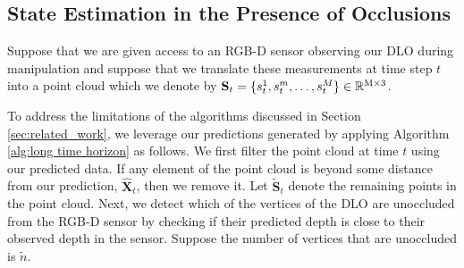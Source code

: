 \subsection{State Estimation in the Presence of Occlusions}
\label{section: filter}

Suppose that we are given access to an RGB-D sensor observing our DLO during manipulation and suppose that we translate these measurements at time step $t$ into a point cloud which we denote by  $\textbf{S}_t = \{s_t^1, s_t^m, \dots, s_t^M\} \in\mathbb{R}^{\text{M}\times3}$.

To address the limitations of the algorithms discussed in Section \ref{sec:related_work}, we leverage our predictions generated by applying Algorithm \ref{alg:long time horizon} as follows.
We first filter the point cloud at time $t$ using our predicted data.
If any element of the point cloud is beyond some distance from our prediction, $\hat{\textbf{X}}_t$, then we remove it.
Let $\tilde{\textbf{S}}_t$ denote the remaining points in the point cloud.
Next, we detect which of the vertices of the DLO are unoccluded from the RGB-D sensor by checking if their predicted depth is close to their observed depth in the sensor.
Suppose the number of vertices that are unoccluded is $\tilde{n}$.

